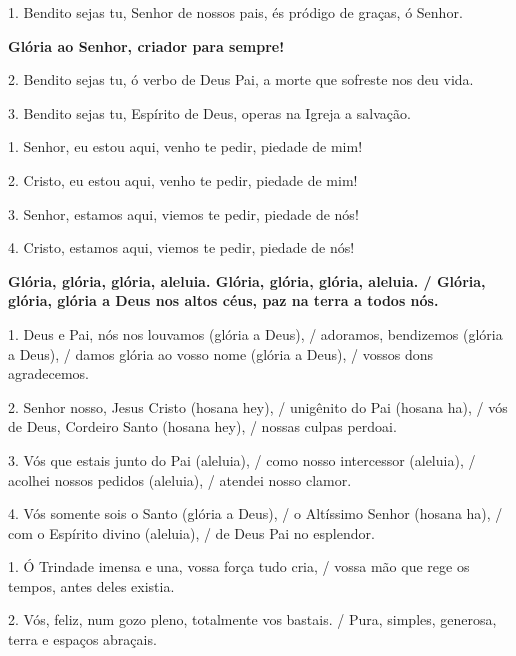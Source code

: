 \documentclass[a5paper,9pt]{extarticle}
\begin{document}
\pagestyle{empty}


\begin{cantos}

\begin{canto}
1. Bendito sejas tu, Senhor de nossos pais, és pródigo de graças, ó Senhor.

\textbf{Glória ao Senhor, criador para sempre! }

2. Bendito sejas tu, ó verbo de Deus Pai, a morte que sofreste nos deu vida.

3. Bendito sejas tu, Espírito de Deus, operas na Igreja a salvação.
\end{canto}

\begin{canto}
1. Senhor, eu estou aqui, venho te pedir, piedade de mim! 

2. Cristo, eu estou aqui, venho te pedir, piedade de mim! 

3. Senhor, estamos aqui, viemos te pedir, piedade de nós! 

4. Cristo, estamos aqui, viemos te pedir, piedade de nós! 
\end{canto}

\begin{canto}
\textbf{Glória, glória, glória, aleluia. Glória, glória, glória, aleluia. / Glória, glória, glória a Deus nos altos céus, paz na terra a todos nós.}

1. Deus e Pai, nós nos louvamos (glória a Deus), / adoramos, bendizemos (glória a Deus), / damos glória ao vosso nome (glória a Deus), / vossos dons agradecemos.

2. Senhor nosso, Jesus Cristo (hosana hey), / unigênito do Pai (hosana ha), / vós de Deus, Cordeiro Santo (hosana hey), / nossas culpas perdoai.

3. Vós que estais junto do Pai (aleluia), / como nosso intercessor (aleluia), / acolhei nossos pedidos (aleluia), / atendei nosso clamor.

4. Vós somente sois o Santo (glória a Deus), / o Altíssimo Senhor (hosana ha), / com o Espírito divino (aleluia), / de Deus Pai no esplendor.
\end{canto}

\begin{canto}
1. Ó Trindade imensa e una, vossa força tudo cria, / vossa mão que rege os tempos, antes deles existia.

2. Vós, feliz, num gozo pleno, totalmente vos bastais. / Pura, simples, generosa, terra e espaços abraçais.


\end{canto}
\end{cantos}
\end{document}
